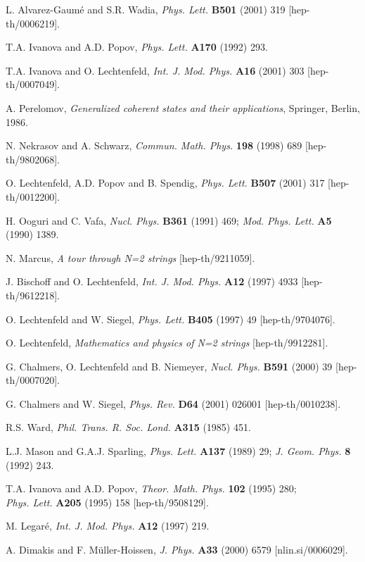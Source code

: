 \documentclass[a4paper,11pt]{article}
\numberwithin{equation}{section}
\begin{document}
\begin{thebibliography}{99}
L. Alvarez-Gaum\'e and S.R. Wadia,
{\sl Phys. Lett.} {\bf B501} (2001) 319 [hep-th/0006219].

T.A. Ivanova and A.D. Popov,
{\sl Phys. Lett.} {\bf A170} (1992) 293.

T.A. Ivanova and O. Lechtenfeld,
{\sl Int. J. Mod. Phys.} {\bf A16} (2001) 303 [hep-th/0007049].

A. Perelomov,
{\it Generalized coherent states and their applications},
Springer, Berlin, 1986.

N. Nekrasov and A. Schwarz,
{\sl Commun. Math. Phys.} {\bf 198} (1998) 689 [hep-th/9802068].

O. Lechtenfeld, A.D. Popov and B. Spendig,
{\sl Phys. Lett.} {\bf B507} (2001) 317 [hep-th/0012200].

H. Ooguri and C. Vafa,
{\sl Nucl. Phys.} {\bf B361} (1991) 469;
{\sl Mod. Phys. Lett.} {\bf A5} (1990) 1389.

N. Marcus,
{\it A tour through N=2 strings}
[hep-th/9211059].

J. Bischoff and O. Lechtenfeld,
{\sl Int. J. Mod. Phys.} {\bf A12} (1997) 4933 [hep-th/9612218].

O. Lechtenfeld and W. Siegel,
{\sl Phys. Lett.} {\bf B405} (1997) 49 [hep-th/9704076].

O. Lechtenfeld,
{\it Mathematics and physics of N=2 strings}
[hep-th/9912281].

G. Chalmers, O. Lechtenfeld and B. Niemeyer,
{\sl Nucl. Phys.} {\bf B591} (2000) 39 [hep-th/0007020].

G. Chalmers and W. Siegel,
{\sl Phys. Rev.} {\bf D64} (2001) 026001 [hep-th/0010238].

R.S. Ward,
{\sl Phil. Trans. R. Soc. Lond.} {\bf A315} (1985) 451.

L.J. Mason and G.A.J. Sparling,
{\sl Phys. Lett.} {\bf A137} (1989) 29;
{\sl J. Geom. Phys.} {\bf 8} (1992) 243.

T.A. Ivanova and A.D. Popov,
{\sl Theor. Math. Phys.} {\bf 102} (1995) 280;\\
{\sl Phys. Lett.} {\bf A205} (1995) 158 [hep-th/9508129].

M. Legar\'e,
{\sl Int. J. Mod. Phys.} {\bf A12} (1997) 219.

A. Dimakis and F. M\"uller-Hoissen,
{\sl J. Phys.} {\bf A33} (2000) 6579 [nlin.si/0006029].


\end{thebibliography}
\end{document}

